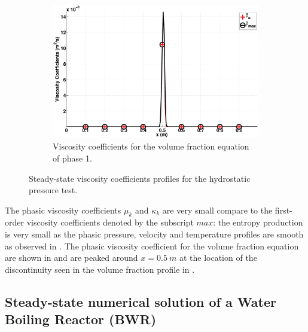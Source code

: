 \documentclass[preprint,10pt]{elsarticle}
\begin{document}
\begin{figure}[H]
        \begin{subfigure}[b]{0.495\textwidth}
                \centering
                \includegraphics[width=\textwidth]{figures/hydrostatic-_liquid_beta.eps}
                \caption{Viscosity coefficients for the volume fraction equation of phase 1.}
                \label{fig:hydrostatic--beta}
        \end{subfigure}        
        \caption{Steady-state viscosity coefficients profiles for the hydrostatic pressure test.}\label{fig:hydrostatic--visc-coeff}
\end{figure}
%
The phasic viscosity coefficients $\mu_k$ and $\kappa_k$ are very small compare to the first-order viscosity coefficients denoted by the subscript $max$: the entropy production is very small as the phasic pressure, velocity and temperature profiles are smooth as observed in . The phasic viscosity coefficient for the volume fraction equation are shown in  and are peaked around $x=0.5 \ m$ at the location of the discontinuity seen in the volume fraction profile in .
  
%
\subsection{Steady-state numerical solution of a Water Boiling Reactor (BWR)}\label{sec:bwr}
%

\end{document}
